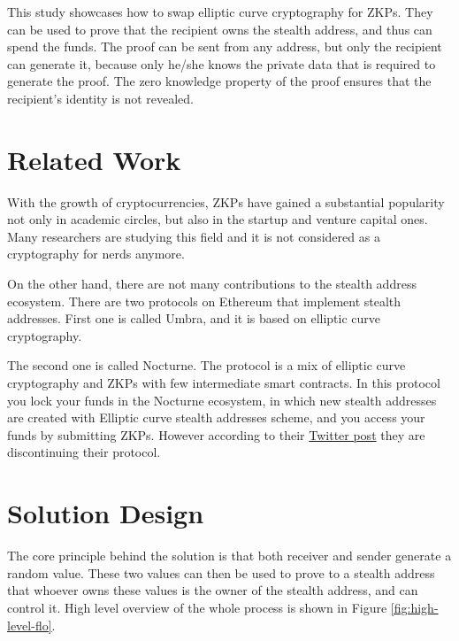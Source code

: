 \documentclass[conference,comsoc,10pt]{IEEEtran}
\begin{document}
        This study showcases how to swap elliptic curve cryptography for ZKPs.
        They can be used to prove that the recipient owns the stealth address, and
        thus can spend the funds. The proof can be sent from any address, but only
        the recipient can generate it, because only he/she knows the private data
        that is required to generate the proof. The zero knowledge property of the
        proof ensures that the recipient's identity is not revealed.

    \section{Related Work}

        With the growth of cryptocurrencies, ZKPs have gained a substantial popularity
        not only in academic circles, but also in the startup and venture capital
        ones. Many researchers are studying this field and it is not considered 
        as a cryptography for nerds anymore.

        On the other hand, there are not many contributions to the stealth address
        ecosystem. There are two protocols on Ethereum that implement stealth addresses.
        First one is called Umbra\cite{umbra}, and it is based on elliptic curve
        cryptography.

        The second one is called Nocturne\cite{nocturne}. The protocol is a mix of
        elliptic curve cryptography and ZKPs with few intermediate smart contracts.
        In this protocol you lock your funds in the Nocturne ecosystem, in which
        new stealth addresses are created with Elliptic curve stealth addresses scheme,
        and you access your funds by submitting ZKPs. However according to their
        \href{https://twitter.com/nocturne_xyz/status/1749510390906511693}{Twitter post}
        they are discontinuing their protocol.

\section{Solution Design}

    The core principle behind the solution is that both
    receiver and sender generate a random value. These two values can then
    be used to prove to a stealth address that whoever owns these values
    is the owner of the stealth address, and can control it. High level
    overview of the whole process is shown in Figure \ref{fig:high-level-flo}.
\end{document}
